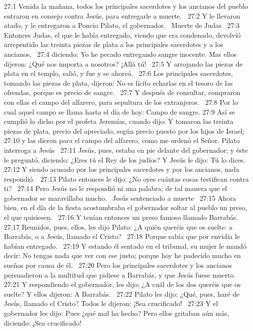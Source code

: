 27:1 Venida la mañana, todos los principales sacerdotes y los ancianos del pueblo entraron en consejo contra Jesús, para entregarle a muerte.  
27:2 Y le llevaron atado, y le entregaron a Poncio Pilato, el gobernador.  
Muerte de Judas  
27:3 Entonces Judas, el que le había entregado, viendo que era condenado, devolvió arrepentido las treinta piezas de plata a los principales sacerdotes y a los ancianos,  
27:4 diciendo: Yo he pecado entregando sangre inocente. Mas ellos dijeron: ¿Qué nos importa a nosotros? ¡Allá tú!  
27:5 Y arrojando las piezas de plata en el templo, salió, y fue y se ahorcó.  
27:6 Los principales sacerdotes, tomando las piezas de plata, dijeron: No es lícito echarlas en el tesoro de las ofrendas, porque es precio de sangre.  
27:7 Y después de consultar, compraron con ellas el campo del alfarero, para sepultura de los extranjeros.  
27:8 Por lo cual aquel campo se llama hasta el día de hoy: Campo de sangre. 
27:9 Así se cumplió lo dicho por el profeta Jeremías, cuando dijo: Y tomaron las treinta piezas de plata, precio del apreciado, según precio puesto por los hijos de Israel;  
27:10 y las dieron para el campo del alfarero, como me ordenó el Señor. 
Pilato interroga a Jesús   
27:11 Jesús, pues, estaba en pie delante del gobernador; y éste le preguntó, diciendo: ¿Eres tú el Rey de los judíos? Y Jesús le dijo: Tú lo dices.  
27:12 Y siendo acusado por los principales sacerdotes y por los ancianos, nada respondió.  
27:13 Pilato entonces le dijo: ¿No oyes cuántas cosas testifican contra ti?  
27:14 Pero Jesús no le respondió ni una palabra; de tal manera que el gobernador se maravillaba mucho.  
Jesús sentenciado a muerte   
27:15 Ahora bien, en el día de la fiesta acostumbraba el gobernador soltar al pueblo un preso, el que quisiesen.  
27:16 Y tenían entonces un preso famoso llamado Barrabás.  
27:17 Reunidos, pues, ellos, les dijo Pilato: ¿A quién queréis que os suelte: a Barrabás, o a Jesús, llamado el Cristo?  
27:18 Porque sabía que por envidia le habían entregado.  
27:19 Y estando él sentado en el tribunal, su mujer le mandó decir: No tengas nada que ver con ese justo; porque hoy he padecido mucho en sueños por causa de él.  
27:20 Pero los principales sacerdotes y los ancianos persuadieron a la multitud que pidiese a Barrabás, y que Jesús fuese muerto.  
27:21 Y respondiendo el gobernador, les dijo: ¿A cuál de los dos queréis que os suelte? Y ellos dijeron: A Barrabás.  
27:22 Pilato les dijo: ¿Qué, pues, haré de Jesús, llamado el Cristo? Todos le dijeron: ¡Sea crucificado!  
27:23 Y el gobernador les dijo: Pues ¿qué mal ha hecho? Pero ellos gritaban aún más, diciendo: ¡Sea crucificado!  
